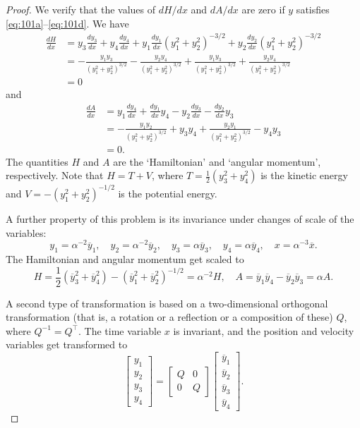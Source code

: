 \begin{proof}

We verify that the values of $dH/dx$ and $dA/dx$ are zero if $y$ satisfies \eqref{eq:101a}--\eqref{eq:101d}. We have
\begin{align*}
\frac{dH}{dx} &= y_3 \frac{dy_3}{dx} + y_4 \frac{dy_4}{dx} + y_1 \frac{dy_1}{dx} \left( y_1^2 + y_2^2 \right)^{-3/2} + y_2 \frac{dy_2}{dx} \left( y_1^2 + y_2^2 \right)^{-3/2} \\
&= -\frac{y_1 y_3}{\left( y_1^2 + y_2^2 \right)^{3/2}} - \frac{y_2 y_4}{\left( y_1^2 + y_2^2 \right)^{3/2}} + \frac{y_1 y_3}{\left( y_1^2 + y_2^2 \right)^{3/2}} + \frac{y_2 y_4}{\left( y_1^2 + y_2^2 \right)^{3/2}} \\
&= 0
\end{align*}
and
\begin{align*}
\frac{dA}{dx} &= y_1 \frac{dy_4}{dx} + \frac{dy_1}{dx} y_4 - y_2 \frac{dy_3}{dx} - \frac{dy_2}{dx} y_3 \\
&= -\frac{y_1 y_2}{\left( y_1^2 + y_2^2 \right)^{3/2}} + y_3 y_4 + \frac{y_2 y_1}{\left( y_1^2 + y_2^2 \right)^{3/2}} - y_4 y_3 \\
&= 0.
\end{align*}
The quantities $H$ and $A$ are the `Hamiltonian' and `angular momentum', respectively. Note that $H = T + V$, where $T = \frac{1}{2} \left( y_3^2 + y_4^2 \right)$ is the kinetic energy and $V = -\left( y_1^2 + y_2^2 \right)^{-1/2}$ is the potential energy.

A further property of this problem is its invariance under changes of scale of the variables:
\[
y_1 = \alpha^{-2} \overline{y}_1, \quad y_2 = \alpha^{-2} \overline{y}_2, \quad y_3 = \alpha \overline{y}_3, \quad y_4 = \alpha \overline{y}_4, \quad x = \alpha^{-3} \overline{x}.
\]
The Hamiltonian and angular momentum get scaled to
\[
H = \frac{1}{2} \left( \overline{y}_3^2 + \overline{y}_4^2 \right) - \left( \overline{y}_1^2 + \overline{y}_2^2 \right)^{-1/2} = \alpha^{-2} H, \quad A = \overline{y}_1 \overline{y}_4 - \overline{y}_2 \overline{y}_3 = \alpha A.
\]

A second type of transformation is based on a two-dimensional orthogonal transformation (that is, a rotation or a reflection or a composition of these) $Q$, where $Q^{-1} = Q^\top$. The time variable $x$ is invariant, and the position and velocity variables get transformed to
\[
\begin{bmatrix}
y_1 \\ y_2 \\ y_3 \\ y_4
\end{bmatrix}
=
\begin{bmatrix}
Q & 0 \\ 0 & Q
\end{bmatrix}
\begin{bmatrix}
\overline{y}_1 \\ \overline{y}_2 \\ \overline{y}_3 \\ \overline{y}_4
\end{bmatrix}.
\]


\end{proof}
